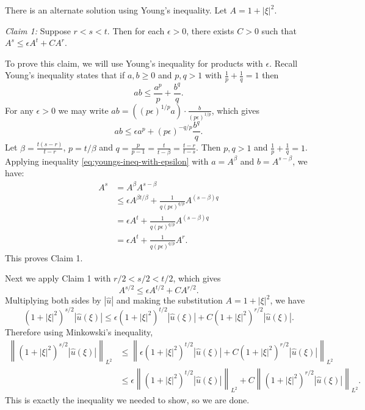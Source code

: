 \documentclass[answers]{exam}
\theoremstyle{problemstyle}
\newcommand{\norm}[1]{\left\lVert#1\right\rVert} %
\newcommand{\1}[1]{\textbf{1}_{\left[#1\right]}} %
\begin{document}
\begin{questions}
\begin{solution}
    There is an alternate solution using Young's inequality. Let $A = 1+|\xi|^{2}$. 
	
	\textit{Claim 1:} Suppose $r<s<t$. Then for each $\epsilon>0$, there exists $C>0$ such that $A^{s} \leq \epsilon A^{t}+ C A^{r}$.

To prove this claim, we will use Young's inequality for products with $\epsilon$. Recall Young's inequality states that if $a,b\geq 0$ and $p,q>1$ with $\frac{1}{p}+\frac{1}{q}=1$ then
\begin{equation*}
  ab\leq \frac{a^{p}}{p}+\frac{b^{q}}{q}.
\end{equation*}
For any $\epsilon>0$ we may write $ab= ((p\epsilon)^{1/p}a)\cdot \frac{b}{(p\epsilon)^{1/p}}$, which gives
\begin{equation}\label{eq:youngs-ineq-with-epsilon}
  ab\leq \epsilon a^{p} + (p\epsilon)^{-q/p}\frac{b^{q}}{q}.
\end{equation}
Let $\beta=\frac{t(s-r)}{t-r}$, $p=t/\beta$ and $q=\frac{p}{p-1}= \frac{t}{t-\beta} =\frac{t-r}{t-s}$. Then $p,q>1$ and $\frac{1}{p}+\frac{1}{q}=1$. Applying inequality \eqref{eq:youngs-ineq-with-epsilon} with $a=A^{\beta}$ and $b=A^{s-\beta}$, we have:
\begin{align*}
  A^{s} &= A^{\beta}A^{s-\beta}\\ 
        &\leq \epsilon A^{\beta t/\beta} + \frac{1}{q(p\epsilon)^{q/p}} A^{(s-\beta) q}\\ 
        &=\epsilon A^{t} + \frac{1}{q(p\epsilon)^{q/p}} A^{(s-\beta) q}\\
        &=\epsilon A^{t} +  \frac{1}{q(p\epsilon)^{q/p}} A^{r}.
\end{align*}
This proves Claim 1.

Next we apply Claim 1 with $r/2<s/2<t/2$, which gives
\begin{equation*}
  A^{s/2}\leq \epsilon A^{t/2}+ C A^{r/2}.
\end{equation*}
Multiplying both sides by $|\hat{u}|$ and making the substitution $A=1+|\xi|^{2}$, we have
\begin{equation*}
  (1+|\xi|^{2})^{s/2}|\hat{u}(\xi)|\leq \epsilon (1+|\xi|^{2})^{t/2}|\hat{u}(\xi)|+ C (1+|\xi|^{2})^{r/2}|\hat{u}(\xi)|.
\end{equation*}
Therefore using Minkowski's inequality,
\begin{align*}
    \norm{(1+|\xi|^{2})^{s/2}|\hat{u}(\xi)|}_{L^{2}}
  &\leq \norm{\epsilon (1+|\xi|^{2})^{t/2}|\hat{u}(\xi)|+ C (1+|\xi|^{2})^{r/2}|\hat{u}(\xi)|}_{L^{2}}\\ 
  &\leq  \epsilon\norm{(1+|\xi|^{2})^{t/2}|\hat{u}(\xi)|}_{L^{2}}+ C\norm{ (1+|\xi|^{2})^{r/2}|\hat{u}(\xi)|}_{L^{2}}.
\end{align*}
This is exactly the inequality we needed to show, so we are done.


\end{solution}
\end{questions}
\end{document}
